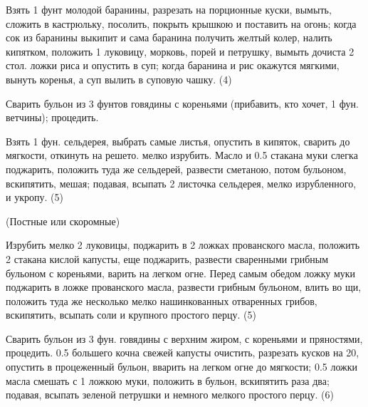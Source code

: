 
Взять 1 фунт молодой баранины, разрезать на порционные куски, вымыть, сложить в кастрюльку, посолить, покрыть крышкою и поставить на огонь; когда сок из баранины выкипит и сама баранина получить желтый колер, налить кипятком, положить 1 луковицу, морковь, порей и петрушку, вымыть дочиста 2 стол. ложки риса и опустить в суп; когда баранина и рис окажутся мягкими, вынуть коренья, а суп вылить в суповую чашку. (4)


Сварить бульон из 3 фунтов говядины с кореньями (прибавить, кто хочет, 1 фун. ветчины); процедить.

Взять 1 фун. сельдерея, выбрать самые листья, опустить в кипяток, сварить до мягкости, откинуть на решето. мелко изрубить. Масло и 0.5 стакана муки слегка поджарить, положить туда же сельдерей, развести сметаною, потом бульоном, вскипятить, мешая; подавая, всыпать 2 листочка сельдерея, мелко изрубленного, и укропу. (5)


(Постные или скоромные)

Изрубить мелко 2 луковицы, поджарить в 2 ложках прованского масла, положить 2 стакана кислой капусты, еще поджарить, развести сваренными грибным бульоном с кореньями, варить на легком огне.
Перед самым обедом ложку муки поджарить в ложке прованского масла, развести грибным бульоном, влить во щи, положить туда же несколько мелко нашинкованных отваренных грибов, вскипятить, всыпать соли и крупного простого перцу. (5)


Сварить бульон из 3 фун. говядины с верхним жиром, с кореньями и пряностями, процедить. 0.5 большего кочна свежей капусты очистить, разрезать кусков на 20, опустить в процеженный бульон, вварить на легком огне до мягкости; 0.5 ложки масла смешать с 1 ложкою муки, положить в бульон, вскипятить раза два; подавая, всыпать зеленой петрушки и немного мелкого простого перцу. (6)


